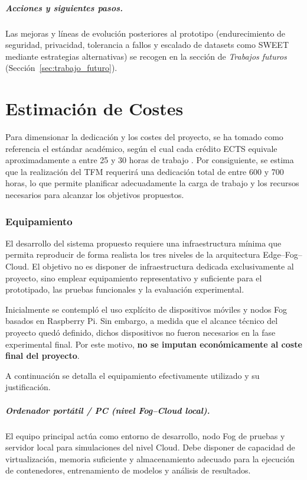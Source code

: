 \documentclass{report}
\begin{document}
\vspace{0.15em}
\paragraph{Acciones y siguientes pasos.}
Las mejoras y líneas de evolución posteriores al prototipo (endurecimiento de seguridad, privacidad, tolerancia a fallos y escalado de datasets como SWEET mediante estrategias alternativas) se recogen en la sección de \textit{Trabajos futuros} (Sección~\ref{sec:trabajo_futuro}).




\chapter{Estimación de Costes}
\label{chap:costes}

Para dimensionar la dedicación y los costes del proyecto, se ha tomado como referencia el estándar académico, según el cual cada crédito ECTS equivale aproximadamente a entre 25 y 30 horas de trabajo \cite{UGR_ECTS}. Por consiguiente, se estima que la realización del TFM requerirá una dedicación total de entre 600 y 700 horas, lo que permite planificar adecuadamente la carga de trabajo y los recursos necesarios para alcanzar los objetivos propuestos.
   


\subsection{Equipamiento}

El desarrollo del sistema propuesto requiere una infraestructura mínima que permita reproducir de forma realista los tres niveles de la arquitectura Edge--Fog--Cloud.  
El objetivo no es disponer de infraestructura dedicada exclusivamente al proyecto, sino emplear equipamiento representativo y suficiente para el prototipado, las pruebas funcionales y la evaluación experimental.

Inicialmente se contempló el uso explícito de dispositivos móviles y nodos Fog basados en Raspberry Pi. Sin embargo, a medida que el alcance técnico del proyecto quedó definido, dichos dispositivos no fueron necesarios en la fase experimental final.  
Por este motivo, \textbf{no se imputan económicamente al coste final del proyecto}.

A continuación se detalla el equipamiento efectivamente utilizado y su justificación.

\paragraph{Ordenador portátil / PC (nivel Fog--Cloud local).}
El equipo principal actúa como entorno de desarrollo, nodo Fog de pruebas y servidor local para simulaciones del nivel Cloud.  
Debe disponer de capacidad de virtualización, memoria suficiente y almacenamiento adecuado para la ejecución de contenedores, entrenamiento de modelos y análisis de resultados.
\end{document}
